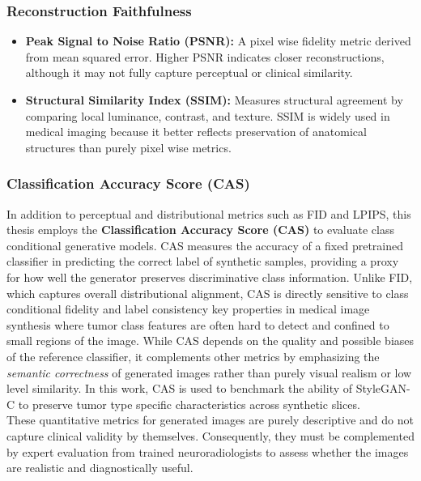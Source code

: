 \subsubsection{Reconstruction Faithfulness}

\begin{itemize}
    \item \textbf{Peak Signal to Noise Ratio (PSNR):} A pixel wise fidelity metric derived from mean squared error. Higher PSNR indicates closer reconstructions, although it may not fully capture perceptual or clinical similarity.

    \item \textbf{Structural Similarity Index (SSIM):} Measures structural agreement by comparing local luminance, contrast, and texture. SSIM is widely used in medical imaging because it better reflects preservation of anatomical structures than purely pixel wise metrics.
\end{itemize}



\subsubsection{Classification Accuracy Score (CAS)}

In addition to perceptual and distributional metrics such as FID and LPIPS, this thesis employs the \textbf{Classification Accuracy Score (CAS)} \cite{ravuri2019classificationaccuracyscoreconditional} to evaluate class conditional generative models. CAS measures the accuracy of a fixed pretrained classifier in predicting the correct label of synthetic samples, providing a proxy for how well the generator preserves discriminative class information. Unlike FID, which captures overall distributional alignment, CAS is directly sensitive to class conditional fidelity and label consistency key properties in medical image synthesis where tumor class features are often hard to detect and confined to small regions of the image. While CAS depends on the quality and possible biases of the reference classifier, it complements other metrics by emphasizing the \emph{semantic correctness} of generated images rather than purely visual realism or low level similarity. In this work, CAS is used to benchmark the ability of StyleGAN-C to preserve tumor type specific characteristics across synthetic slices.\\

These quantitative metrics for generated images are purely descriptive and do not capture clinical validity by themselves. Consequently, they must be complemented by expert evaluation from trained neuroradiologists to assess whether the images are realistic and diagnostically useful.

